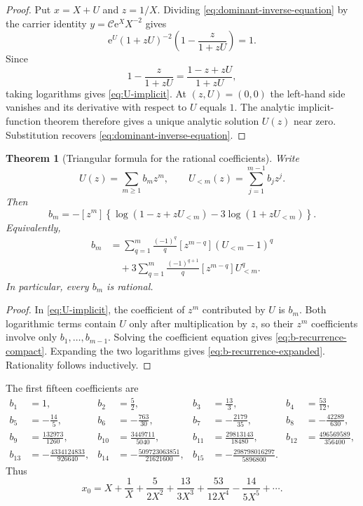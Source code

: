 \documentclass[11pt,a4paper]{article}
\numberwithin{equation}{section}
\newtheorem{theorem}{Theorem}[section]
\theoremstyle{remark}
\newcommand{\e}{\mathrm e}
\newcommand{\Ccal}{\mathcal C}
\begin{document}
\begin{proof}
Put $x=X+U$ and $z=1/X$.  Dividing \cref{eq:dominant-inverse-equation} by the carrier identity $y=\Ccal\e^XX^{-2}$ gives
\[
 \e^U(1+zU)^{-2}
 \left(1-\frac{z}{1+zU}\right)=1.
\]
Since
\[
 1-\frac{z}{1+zU}=\frac{1-z+zU}{1+zU},
\]
taking logarithms gives \cref{eq:U-implicit}.  At $(z,U)=(0,0)$ the left-hand side vanishes and its derivative with respect to $U$ equals $1$.  The analytic implicit-function theorem therefore gives a unique analytic solution $U(z)$ near zero.  Substitution recovers \cref{eq:dominant-inverse-equation}.
\end{proof}

\begin{theorem}[Triangular formula for the rational coefficients]\label{thm:b-recurrence}
Write
\begin{equation}\label{eq:U-b}
 U(z)=\sum_{m\ge1}b_mz^m,
 \qquad U_{<m}(z)=\sum_{j=1}^{m-1}b_jz^j.
\end{equation}
Then
\begin{equation}\label{eq:b-recurrence-compact}
 \boxed{
 b_m=-[z^m]\left\{
 \log(1-z+zU_{<m})-3\log(1+zU_{<m})
 \right\}.}
\end{equation}
Equivalently,
\begin{align}
 b_m
 &=\sum_{q=1}^{m}\frac{(-1)^q}{q}
 [z^{m-q}](U_{<m}-1)^q
 \label{eq:b-recurrence-expanded}\\
 &\quad+3\sum_{q=1}^{m}\frac{(-1)^{q+1}}{q}
 [z^{m-q}]U_{<m}^{q}.
 \nonumber
\end{align}
In particular, every $b_m$ is rational.
\end{theorem}

\begin{proof}
In \cref{eq:U-implicit}, the coefficient of $z^m$ contributed by $U$ is $b_m$.  Both logarithmic terms contain $U$ only after multiplication by $z$, so their $z^m$ coefficients involve only $b_1,\ldots,b_{m-1}$.  Solving the coefficient equation gives \cref{eq:b-recurrence-compact}.  Expanding the two logarithms gives \cref{eq:b-recurrence-expanded}.  Rationality follows inductively.
\end{proof}

The first fifteen coefficients are
\begin{align}
 b_1&=1,&
 b_2&=\frac52,&
 b_3&=\frac{13}{3},&
 b_4&=\frac{53}{12},\nonumber\\
 b_5&=-\frac{14}{5},&
 b_6&=-\frac{763}{30},&
 b_7&=-\frac{2179}{35},&
 b_8&=-\frac{42289}{630},\nonumber\\
 b_9&=\frac{132973}{1260},&
 b_{10}&=\frac{3449711}{5040},&
 b_{11}&=\frac{29813143}{18480},&
 b_{12}&=\frac{496569589}{356400},\nonumber\\
 b_{13}&=-\frac{4334124833}{926640},&
 b_{14}&=-\frac{509723063851}{21621600},&
 b_{15}&=-\frac{298798016297}{5896800}.\label{eq:b-first}
\end{align}
Thus
\begin{equation}\label{eq:x0-first}
 x_0=X+\frac1X+\frac{5}{2X^2}+\frac{13}{3X^3}
 +\frac{53}{12X^4}-\frac{14}{5X^5}+\cdots.
\end{equation}
\end{document}
